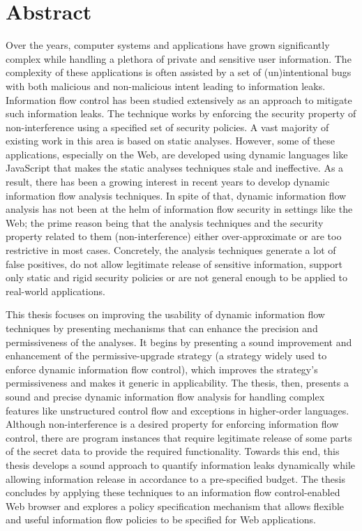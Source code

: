\section*{Abstract}

{
Over the years, computer systems and applications have grown
significantly complex while handling a plethora of private and
sensitive user information. The complexity of these applications is
often assisted by a set of (un)intentional bugs with both malicious
and non-malicious intent leading to information leaks. Information
flow control has been studied extensively as an approach to mitigate
such information leaks. The technique works by enforcing the security
property of non-interference using a specified set of security
policies. A vast majority of existing work in this area
is based on static analyses. However, some of these applications,
especially on the Web, are developed using dynamic languages like
JavaScript that makes the static analyses techniques stale and
ineffective. As a result, there has been a growing interest in recent
years to develop dynamic information flow analysis techniques. In
spite of that, dynamic information flow analysis has not been at the
helm of information flow security in settings like the Web; the prime
reason being that the analysis techniques and the security property
related to them (non-interference) either over-approximate or are too
restrictive in most cases. Concretely, the analysis techniques
generate a lot of false positives, do not allow legitimate release of
sensitive information, support only static and rigid security
policies or are not general enough to be applied to real-world
applications. 

This thesis focuses on improving the usability of dynamic information
flow techniques by presenting mechanisms that can enhance the
precision and permissiveness of the analyses. It begins by presenting
a sound improvement and enhancement of the permissive-upgrade
strategy (a strategy widely used to enforce dynamic information flow
control), which improves the strategy's permissiveness and makes it
generic in applicability. The thesis, then, presents a sound and
precise dynamic information flow analysis for handling complex
features like unstructured control flow and exceptions in higher-order 
languages. Although non-interference is a desired property for
enforcing information flow control, there are program instances that
require legitimate release of some parts of the secret data to provide
the required functionality. Towards this end, this thesis develops a sound 
approach to quantify information leaks dynamically while allowing 
information release in accordance to a pre-specified budget. The thesis
concludes by applying these techniques to an information flow
control-enabled Web browser and explores a policy specification 
mechanism that allows flexible and useful information flow policies to 
be specified for Web applications. 

}

